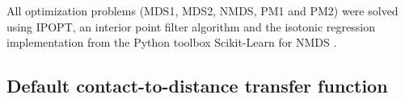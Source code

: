 

All optimization problems (MDS1, MDS2, NMDS, PM1 and PM2) were solved using IPOPT, an interior point filter
algorithm \citep{wachter:on} and the isotonic regression implementation from
the Python toolbox Scikit-Learn for NMDS \citep{pedegrosa:scikit}.


\subsection{Default contact-to-distance transfer function}
\label{sec:evaluating_parameters}

